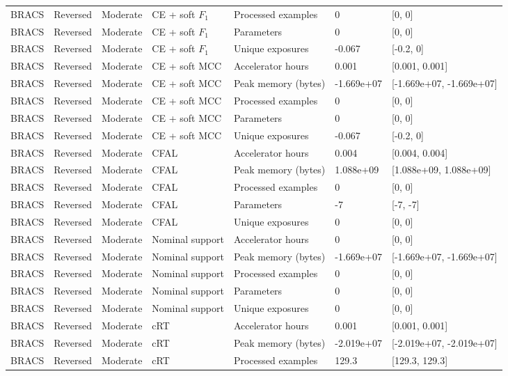 \begin{longtable}{lllllll}
BRACS & Reversed & Moderate & CE + soft $F_1$ & Processed examples & 0 & [0, 0] \\
BRACS & Reversed & Moderate & CE + soft $F_1$ & Parameters & 0 & [0, 0] \\
BRACS & Reversed & Moderate & CE + soft $F_1$ & Unique exposures & -0.067 & [-0.2, 0] \\
BRACS & Reversed & Moderate & CE + soft MCC & Accelerator hours & 0.001 & [0.001, 0.001] \\
BRACS & Reversed & Moderate & CE + soft MCC & Peak memory (bytes) & -1.669e+07 & [-1.669e+07, -1.669e+07] \\
BRACS & Reversed & Moderate & CE + soft MCC & Processed examples & 0 & [0, 0] \\
BRACS & Reversed & Moderate & CE + soft MCC & Parameters & 0 & [0, 0] \\
BRACS & Reversed & Moderate & CE + soft MCC & Unique exposures & -0.067 & [-0.2, 0] \\
BRACS & Reversed & Moderate & CFAL & Accelerator hours & 0.004 & [0.004, 0.004] \\
BRACS & Reversed & Moderate & CFAL & Peak memory (bytes) & 1.088e+09 & [1.088e+09, 1.088e+09] \\
BRACS & Reversed & Moderate & CFAL & Processed examples & 0 & [0, 0] \\
BRACS & Reversed & Moderate & CFAL & Parameters & -7 & [-7, -7] \\
BRACS & Reversed & Moderate & CFAL & Unique exposures & 0 & [0, 0] \\
BRACS & Reversed & Moderate & Nominal support & Accelerator hours & 0 & [0, 0] \\
BRACS & Reversed & Moderate & Nominal support & Peak memory (bytes) & -1.669e+07 & [-1.669e+07, -1.669e+07] \\
BRACS & Reversed & Moderate & Nominal support & Processed examples & 0 & [0, 0] \\
BRACS & Reversed & Moderate & Nominal support & Parameters & 0 & [0, 0] \\
BRACS & Reversed & Moderate & Nominal support & Unique exposures & 0 & [0, 0] \\
BRACS & Reversed & Moderate & cRT & Accelerator hours & 0.001 & [0.001, 0.001] \\
BRACS & Reversed & Moderate & cRT & Peak memory (bytes) & -2.019e+07 & [-2.019e+07, -2.019e+07] \\
BRACS & Reversed & Moderate & cRT & Processed examples & 129.3 & [129.3, 129.3] \\

\end{longtable}
